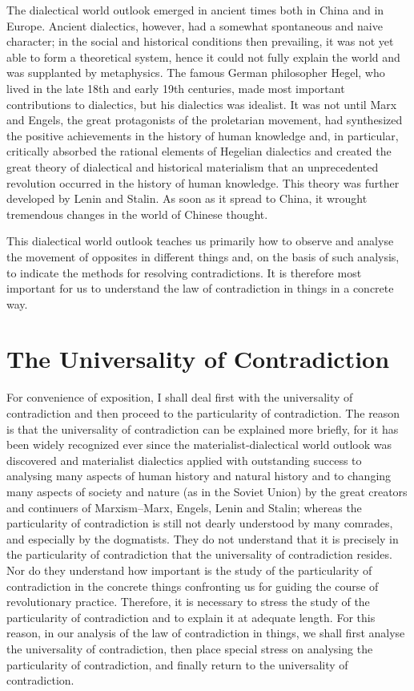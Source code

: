 \documentclass{article}
\begin{document}
The dialectical world outlook emerged in ancient times both in China and
in Europe. Ancient dialectics, however, had a somewhat spontaneous and
naive character; in the social and historical conditions then prevailing,
it was not yet able to form a theoretical system, hence it could not fully
explain the world and was supplanted by metaphysics. The famous German
philosopher Hegel, who lived in the late 18th and early 19th centuries,
made most important contributions to dialectics, but his dialectics was
idealist. It was not until Marx and Engels, the great protagonists of the
proletarian movement, had synthesized the positive achievements in the
history of human knowledge and, in particular, critically absorbed the
rational elements of Hegelian dialectics and created the great theory of
dialectical and historical materialism that an unprecedented revolution
occurred in the history of human knowledge. This theory was further
developed by Lenin and Stalin. As soon as it spread to China, it wrought
tremendous changes in the world of Chinese thought.

This dialectical world outlook teaches us primarily how to observe and
analyse the movement of opposites in different things and, on the basis of
such analysis, to indicate the methods for resolving contradictions. It is
therefore most important for us to understand the law of contradiction in
things in a concrete way.

\section{The Universality of Contradiction}

For convenience of exposition, I shall deal first with the universality of
contradiction and then proceed to the particularity of contradiction. The
reason is that the universality of contradiction can be explained more briefly,
for it has been widely recognized ever since the materialist-dialectical world
outlook was discovered and materialist dialectics applied with outstanding
success to analysing many aspects of human history and natural history and
to changing many aspects of society and nature (as in the Soviet Union) by
the great creators and continuers of Marxism--Marx, Engels, Lenin and
Stalin; whereas the particularity of contradiction is still not dearly
understood by many comrades, and especially by the dogmatists. They do not
understand that it is precisely in the particularity of contradiction that
the universality of contradiction resides. Nor do they understand how
important is the study of the particularity of contradiction in the
concrete things confronting us for guiding the course of revolutionary
practice. Therefore, it is necessary to stress the study of the
particularity of contradiction and to explain it at adequate length. For
this reason, in our analysis of the law of contradiction in things, we
shall first analyse the universality of contradiction, then place special
stress on analysing the particularity of contradiction, and finally return
to the universality of contradiction.
\end{document}
